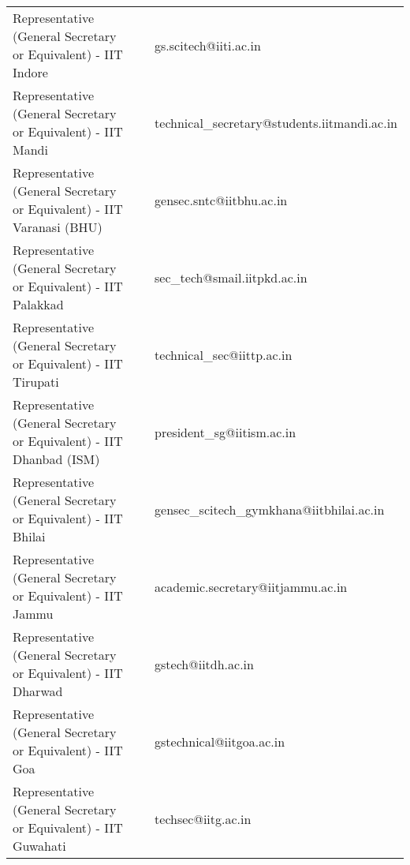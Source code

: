 \begin{center}
\begin{longtable}{m{7cm} p{0.5cm} m{7cm}}
Representative (General Secretary or Equivalent) - IIT Indore& &
gs.scitech@iiti.ac.in\\
Representative (General Secretary or Equivalent) - IIT Mandi& &
technical\_secretary@students.iitmandi.ac.in\\
Representative (General Secretary or Equivalent) - IIT Varanasi (BHU)& &
gensec.sntc@iitbhu.ac.in\\
Representative (General Secretary or Equivalent) - IIT Palakkad& &
sec\_tech@smail.iitpkd.ac.in\\
Representative (General Secretary or Equivalent) - IIT Tirupati& &
technical\_sec@iittp.ac.in\\
Representative (General Secretary or Equivalent) - IIT Dhanbad (ISM)& &
president\_sg@iitism.ac.in\\
Representative (General Secretary or Equivalent) - IIT Bhilai& &
gensec\_scitech\_gymkhana@iitbhilai.ac.in\\
Representative (General Secretary or Equivalent) - IIT Jammu& &
academic.secretary@iitjammu.ac.in\\
Representative (General Secretary or Equivalent) - IIT Dharwad& &
gstech@iitdh.ac.in\\
Representative (General Secretary or Equivalent) - IIT Goa& &
gstechnical@iitgoa.ac.in\\
Representative (General Secretary or Equivalent) - IIT Guwahati& &
techsec@iitg.ac.in\\
\hline
\end{longtable}
\end{center}

